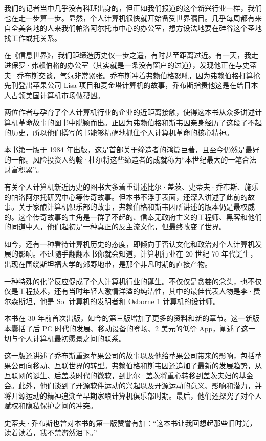 \documentclass[12pt,UTF8]{ctexbook}
\begin{document}
我们的记者当中几乎没有科班出身的，但正如我们报道的这个新兴行业一样，我们也在走一步算一步。显然，个人计算机很快就开始备受世界瞩目。几乎每周都有来自全美各地的人来我们帕洛阿尔托市中心的办公室，想方设法地要在硅谷这个圣地找工作或托关系。

在《信息世界》，我们距缔造历史仅一步之遥，有时甚至距离过近。有一天，我走进保罗·弗赖伯格的办公室（其实就是一条没有窗户的过道），发现他正在与史蒂夫·乔布斯交谈，气氛非常紧张。乔布斯冲着弗赖伯格怒吼，因为弗赖伯格打算抢先刊登出苹果公司 Lisa 项目和麦金塔计算机的故事，乔布斯指责他这是在给日本人占领美国计算机市场做帮凶。

两位作者与孕育了个人计算机行业的企业的近距离接触，使得这本书从众多讲述计算机革命故事的图书中脱颖而出。正因为弗赖伯格和斯韦因亲身经历了这段了不起的历史，所以他们撰写的书能够精确地抓住个人计算机革命的核心精神。

本书第一版于 1984 年出版，这是首部关于缔造者的鸿篇巨著，且至今仍然是最好的一部。风险投资人约翰·杜尔将这些缔造者的成就称为“本世纪最大的一笔合法财富积累”。

有关个人计算机新近历史的图书大多着重讲述比尔·盖茨、史蒂夫·乔布斯、施乐的帕洛阿尔托研究中心等传奇故事。但本书不浮于表面，还深入讲述了此前的故事。关于家酿计算机俱乐部的故事，弗赖伯格和斯韦因所讲述的版本仍是最权威的。这个传奇故事的主角是一群了不起的、信奉无政府主义的工程师、黑客和他们的同道中人，他们起初是一种真正的反主流文化，但最终改变了世界。

如今，还有一种看待计算机历史的态度，即倾向于否认文化和政治对个人计算机发展的影响。不过随手翻翻本书你就会知道，计算机行业在 20 世纪 70 年代诞生，出现在围绕斯坦福大学的郊野地带，是那个非凡时期的直接产物。

一种特殊的化学反应促成了个人计算机行业的诞生。不仅仅是贪婪的念头，也不仅仅是工程技术，还有当时年轻人激情洋溢的纯洁性，其中的最佳代表人物是李·费尔森斯坦，他是 Sol 计算机的发明者和 Osborne 1 计算机的设计师。

本书在 30 年前首次出版，如今的第三版增加了更多的资料和新的章节。这一新版本囊括了后 PC 时代的发展、移动设备的登场、2 美元的低价 App，阐述了这一切与个人计算机最初愿景之间的联系。

这一版还讲述了乔布斯重返苹果公司的故事以及他给苹果公司带来的影响，包括苹果公司向移动、互联世界的转型。弗赖伯格和斯韦因还追加了最新的发展趋势，从互联网的诞生、后盖茨时代的微软，到比尔·盖茨将重心转移到盖茨夫妇的基金会。此外，他们谈到了开源软件运动的兴起以及开源运动的意义、影响和潜力，并将开源运动的精神追溯至早期家酿计算机俱乐部时期。最后，他们还探究了对个人赋权和隐私保护之间的冲突。

史蒂夫·乔布斯也曾对本书的第一版赞誉有加：“这本书让我回想起那些旧时光，读着读着，我不禁潸然泪下。”
\end{document}
